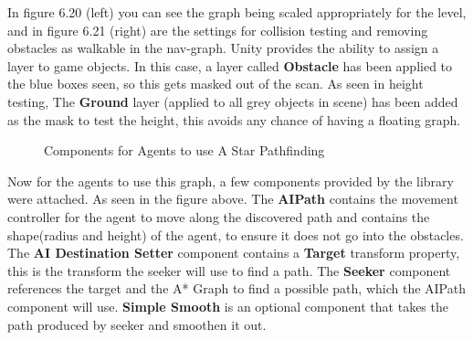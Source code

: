 \documentclass[11pt]{report}
\begin{document}
In figure 6.20 (left) you can see the graph being scaled appropriately for the level, and in figure 6.21 (right) are the settings for collision testing and removing obstacles as walkable in the nav-graph. Unity provides the ability to assign a layer to game objects. In this case, a layer called \textbf{Obstacle} has been applied to the blue boxes seen, so this gets masked out of the scan. As seen in height testing, The \textbf{Ground} layer (applied to all grey objects in scene) has been added as the mask to test the height, this avoids any chance of having a floating graph.

\begin{figure}[H]
    \centering
    \caption{Components for Agents to use A Star Pathfinding}
\end{figure}

Now for the agents to use this graph, a few components provided by the library were attached. As seen in the figure above. The \textbf{AIPath} contains the movement controller for the agent to move along the discovered path and contains the shape(radius and height) of the agent, to ensure it does not go into the obstacles. The \textbf{AI Destination Setter} component contains a \textbf{Target} transform property, this is the transform the seeker will use to find a path. The \textbf{Seeker} component references the target and the A* Graph to find a possible path, which the AIPath component will use. \textbf{Simple Smooth} is an optional component that takes the path produced by seeker and smoothen it out.
\end{document}
